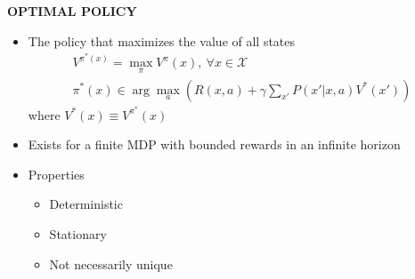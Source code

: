 \begin{whitebox}{\textbf{OPTIMAL POLICY}}
    \begin{itemize}
        \item The policy that maximizes the value of all states
        \begin{align*}
            V^{\pi^*(x)}=\max_\pi V^\pi(x),\ \forall x\in\mathcal{X}\\
            \pi^*(x)\in\arg\max_a\left(R(x,a)+\gamma\sum_{x'}P(x'|x,a)V^*(x')\right)
        \end{align*}
        where $V^*(x)\equiv V^{\pi^*}(x)$
        \item Exists for a finite MDP with bounded rewards in an infinite horizon
        \item Properties
        \begin{itemize}
            \item Deterministic
            \item Stationary
            \item Not necessarily unique
        \end{itemize}
    \end{itemize}
\end{whitebox}

